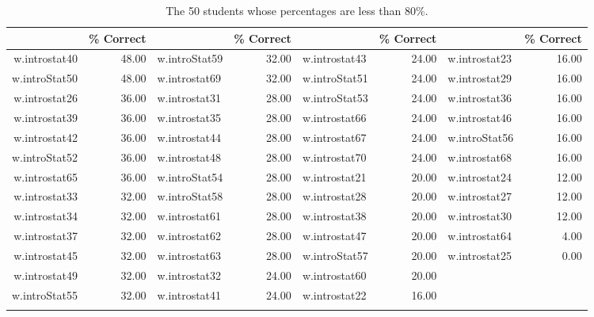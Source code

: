 \documentclass[12pt,english,nohyper]{tufte-handout}\usepackage[]{graphicx}\usepackage[]{color}
\begin{document}
\bigskip{}

\begin{fullwidth}
\makeatletter\setlength\hsize{\@tufte@fullwidth}\makeatother
\begin{longtable}{rr|lr|lr|lr}
  \hline
  & \% Correct &   & \% Correct &   & \% Correct &   & \% Correct \\ 
  \hline
w.introstat40 & 48.00 & w.introStat59 & 32.00 & w.introstat43 & 24.00 & w.introstat23 & 16.00 \\ 
  w.introStat50 & 48.00 & w.introstat69 & 32.00 & w.introStat51 & 24.00 & w.introstat29 & 16.00 \\ 
  w.introstat26 & 36.00 & w.introstat31 & 28.00 & w.introStat53 & 24.00 & w.introstat36 & 16.00 \\ 
  w.introstat39 & 36.00 & w.introstat35 & 28.00 & w.introstat66 & 24.00 & w.introstat46 & 16.00 \\ 
  w.introstat42 & 36.00 & w.introstat44 & 28.00 & w.introstat67 & 24.00 & w.introStat56 & 16.00 \\ 
  w.introStat52 & 36.00 & w.introstat48 & 28.00 & w.introstat70 & 24.00 & w.introstat68 & 16.00 \\ 
  w.introstat65 & 36.00 & w.introStat54 & 28.00 & w.introstat21 & 20.00 & w.introstat24 & 12.00 \\ 
  w.introstat33 & 32.00 & w.introStat58 & 28.00 & w.introstat28 & 20.00 & w.introstat27 & 12.00 \\ 
  w.introstat34 & 32.00 & w.introstat61 & 28.00 & w.introstat38 & 20.00 & w.introstat30 & 12.00 \\ 
  w.introstat37 & 32.00 & w.introstat62 & 28.00 & w.introstat47 & 20.00 & w.introstat64 & 4.00 \\ 
  w.introstat45 & 32.00 & w.introstat63 & 28.00 & w.introStat57 & 20.00 & w.introstat25 & 0.00 \\ 
  w.introstat49 & 32.00 & w.introstat32 & 24.00 & w.introstat60 & 20.00 &  &  \\ 
  w.introStat55 & 32.00 & w.introstat41 & 24.00 & w.introstat22 & 16.00 &  &  \\ 
   \hline
\hline
\caption{The  50 students whose percentages are less than 80\%.} 
\label{tab:studentsbelow80}
\end{longtable}

\end{fullwidth}



\vspace{-2mm}
\end{document}
